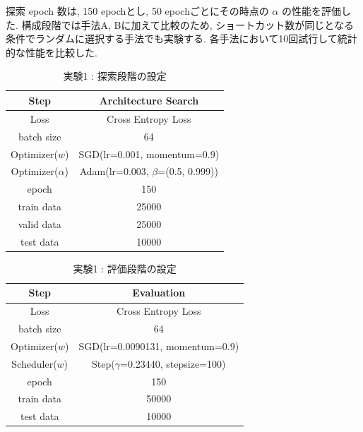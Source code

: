 探索 epoch 数は, 150 epochとし, 50 epochごとにその時点の $\alpha$ の性能を評価した.
構成段階では手法A, Bに加えて比較のため,
ショートカット数が同じとなる条件でランダムに選択する手法でも実験する.
各手法において10回試行して統計的な性能を比較した.

\begin{table}[tb]
  \begin{center}
    \caption{実験1 : 探索段階の設定}
  	\vspace{3mm}
    \begin{tabular}{|c|c|} \hline
      Step & Architecture Search \\ \hline\hline
      Loss & Cross Entropy Loss \\ \hline
      batch size & 64 \\ \hline
      Optimizer($w$) & SGD(lr=0.001, momentum=0.9) \\ \hline
      Optimizer($\alpha$) & Adam(lr=0.003, $\beta$=(0.5, 0.999)) \\ \hline
      epoch & 150\\ \hline
      train data & 25000\\ \hline
      valid data & 25000\\ \hline
      test data &  10000\\ \hline
    \end{tabular}
    \label{tab:setting_exp}
  \end{center}
\end{table}

\begin{table}[tb]
  \begin{center}
    \caption{実験1 : 評価段階の設定}
  	\vspace{3mm}
    \begin{tabular}{|c|c|} \hline
      Step & Evaluation \\ \hline\hline
      Loss & Cross Entropy Loss \\ \hline
      batch size & 64 \\ \hline
      Optimizer($w$) & SGD(lr=0.0090131, momentum=0.9) \\ \hline
      Scheduler($w$) & Step($\gamma$=0.23440, stepsize=100) \\ \hline
      epoch & 150\\ \hline
      train data & 50000\\ \hline
      test data &  10000\\ \hline
    \end{tabular}
    \label{tab:exp2/eval}
  \end{center}
\end{table}


